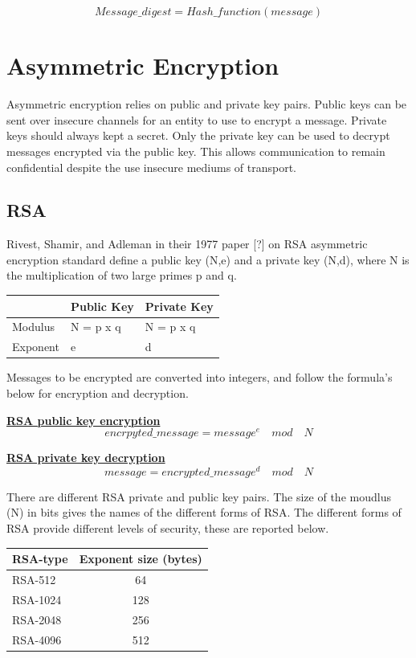 \documentclass[bsc,frontabs,twoside,singlespacing,parskip,deptreport]{infthesis}     %
\begin{document}
$$ Message\_digest = Hash\_function(message) $$


\section{Asymmetric Encryption}

Asymmetric encryption relies on public and private key pairs. Public keys can be sent over insecure channels for an entity to use to encrypt a message. Private keys should always kept a secret. Only the private key can be used to decrypt messages encrypted via the public key. This allows communication to remain confidential despite the use insecure mediums of transport.

\subsection{RSA}
Rivest, Shamir, and Adleman in their 1977 paper [?] on RSA asymmetric encryption standard define a public key (N,e) and a private key (N,d), where N is the multiplication of two large primes p and q. 

\begin{table}[H]
\begin{tabular}{|l|l|l|}
\hline
 & Public Key & Private Key\\
\hline
Modulus & N = p x q & N = p x q\\
\hline
Exponent & e & d\\
\hline
\end{tabular}
\end{table}

Messages to be encrypted are converted into integers, and follow the formula's below for encryption and decryption.

\underline{\textbf{RSA public key encryption}}\\
$$ encrpyted\_message =  message^e  \quad mod \quad N $$

\underline{\textbf{RSA private key decryption}}\\
$$ message =  encrypted\_message^d  \quad mod \quad N $$

There are different RSA private and public key pairs. The size of the moudlus (N) in bits gives the names of the different forms of RSA. The different forms of RSA provide different levels of security, these are reported below.

\begin{table}[H]
\begin{tabular}{|l|c|}
\hline
RSA-type & Exponent size (bytes)\\
\hline
RSA-512 & 64\\
RSA-1024 & 128\\
RSA-2048 & 256\\
RSA-4096 & 512\\
\hline
\end{tabular}
\end{table}
\end{document}
